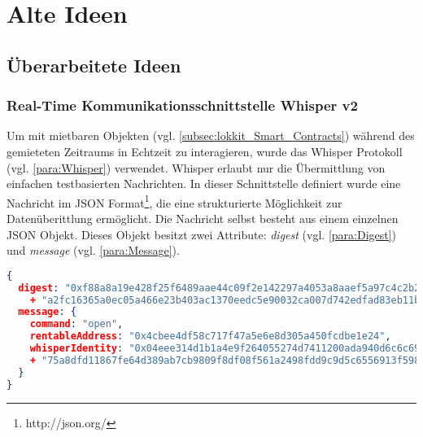 \chapter{Alte Ideen}

\section{Überarbeitete Ideen}

\subsection{Real-Time Kommunikationsschnittstelle Whisper v2}
Um mit mietbaren Objekten (vgl. \ref{subsec:lokkit_Smart_Contracts}) während des gemieteten Zeitraums in Echtzeit zu interagieren, wurde das Whisper Protokoll (vgl. \ref{para:Whisper}) verwendet. Whisper erlaubt nur die Übermittlung von einfachen testbasierten Nachrichten. In dieser Schnittstelle definiert wurde eine Nachricht im JSON Format\footnote{http://json.org/}, die eine strukturierte Möglichkeit zur Datenüberittlung ermöglicht.
Die Nachricht selbst besteht aus einem einzelnen JSON Objekt. Dieses Objekt besitzt zwei Attribute: \emph{digest} (vgl. \ref{para:Digest}) und \emph{message} (vgl. \ref{para:Message}).

\begin{lstlisting}[language=json,caption={Beispiel einer Real-Time Nachricht via Whisper Protokoll}]
{
  digest: "0xf88a8a19e428f25f6489aae44c09f2e142297a4053a8aaef5a97c4c2b246c89477"
    + "a2fc16365a0ec05a466e23b403ac1370eedc5e90032ca007d742edfad83eb11b",
  message: {
    command: "open",
    rentableAddress: "0x4cbee4df58c717f47a5e6e8d305a450fcdbe1e24",
    whisperIdentity: "0x04eee314d1b1a4e9f264055274d7411200ada940d6c6c698d53bf40b41ff0f5277"
    + "75a8dfd11867fe64d389ab7cb9809f8df08f561a2498fdd9c9d5c6556913f598"
  }
}
\end{lstlisting}

